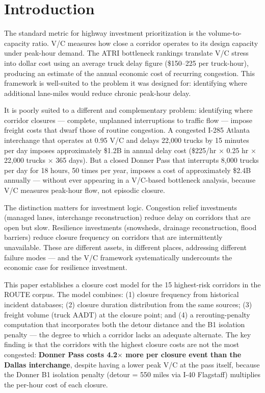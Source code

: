 \section{Introduction}

The standard metric for highway investment prioritization is the volume-to-capacity ratio.
V/C measures how close a corridor operates to its design capacity under peak-hour demand.
The ATRI bottleneck rankings translate V/C stress into dollar cost using an average truck
delay figure (\$150--225 per truck-hour), producing an estimate of the annual economic
cost of recurring congestion. This framework is well-suited to the problem it was designed
for: identifying where additional lane-miles would reduce chronic peak-hour delay.

It is poorly suited to a different and complementary problem: identifying where corridor
closures --- complete, unplanned interruptions to traffic flow --- impose freight costs that
dwarf those of routine congestion. A congested I-285 Atlanta interchange that operates
at 0.95 V/C and delays 22,000 trucks by 15 minutes per day imposes approximately
\$1.2B in annual delay cost (\$225/hr $\times$ 0.25 hr $\times$ 22,000 trucks $\times$
365 days). But a closed Donner Pass that interrupts 8,000 trucks per day for 18 hours,
50 times per year, imposes a cost of approximately \$2.4B annually --- without ever
appearing in a V/C-based bottleneck analysis, because V/C measures peak-hour flow,
not episodic closure.

The distinction matters for investment logic. Congestion relief investments (managed
lanes, interchange reconstruction) reduce delay on corridors that are open but slow.
Resilience investments (snowsheds, drainage reconstruction, flood barriers) reduce
closure frequency on corridors that are intermittently unavailable. These are different
assets, in different places, addressing different failure modes --- and the V/C framework
systematically undercounts the economic case for resilience investment.

This paper establishes a closure cost model for the 15 highest-risk corridors in the
ROUTE corpus. The model combines: (1) closure frequency from historical incident databases;
(2) closure duration distribution from the same sources; (3) freight volume (truck AADT)
at the closure point; and (4) a rerouting-penalty computation that incorporates both the
detour distance and the B1 isolation penalty \citep{ROUTE_B1} --- the degree to which
a corridor lacks an adequate alternate. The key finding is that the corridors with the
highest closure costs are not the most congested: \textbf{Donner Pass costs 4.2$\times$
more per closure event than the Dallas interchange}, despite having a lower peak V/C at
the pass itself, because the Donner B1 isolation penalty (detour = 550 miles via I-40
Flagstaff) multiplies the per-hour cost of each closure.

